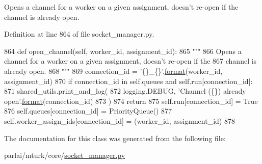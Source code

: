 \begin{DoxyVerb}Opens a channel for a worker on a given assignment, doesn't re-open if the
channel is already open.
\end{DoxyVerb}
 

Definition at line 864 of file socket\+\_\+manager.\+py.


\begin{DoxyCode}
864     \textcolor{keyword}{def }open\_channel(self, worker\_id, assignment\_id):
865         \textcolor{stringliteral}{"""}
866 \textcolor{stringliteral}{        Opens a channel for a worker on a given assignment, doesn't re-open if the}
867 \textcolor{stringliteral}{        channel is already open.}
868 \textcolor{stringliteral}{        """}
869         connection\_id = \textcolor{stringliteral}{'\{\}\_\{\}'}.\hyperlink{namespaceparlai_1_1chat__service_1_1services_1_1messenger_1_1shared__utils_a32e2e2022b824fbaf80c747160b52a76}{format}(worker\_id, assignment\_id)
870         \textcolor{keywordflow}{if} connection\_id \textcolor{keywordflow}{in} self.queues \textcolor{keywordflow}{and} self.run[connection\_id]:
871             shared\_utils.print\_and\_log(
872                 logging.DEBUG, \textcolor{stringliteral}{'Channel (\{\}) already open'}.\hyperlink{namespaceparlai_1_1chat__service_1_1services_1_1messenger_1_1shared__utils_a32e2e2022b824fbaf80c747160b52a76}{format}(connection\_id)
873             )
874             \textcolor{keywordflow}{return}
875         self.run[connection\_id] = \textcolor{keyword}{True}
876         self.queues[connection\_id] = PriorityQueue()
877         self.worker\_assign\_ids[connection\_id] = (worker\_id, assignment\_id)
878 \end{DoxyCode}


The documentation for this class was generated from the following file\+:\begin{DoxyCompactItemize}
\item 
parlai/mturk/core/\hyperlink{socket__manager_8py}{socket\+\_\+manager.\+py}\end{DoxyCompactItemize}
